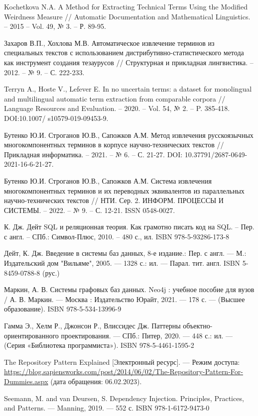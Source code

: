 \begin{thebibliography}{}
	Kochetkova N.A. A Method for Extracting Technical Terms Using the Modified Weirdness Measure // Automatic Documentation and Mathematical Linguistics. – 2015 – Vol. 49, № 3. – Р. 89-95.
	
	Захаров В.П., Хохлова М.В. Автоматическое извлечение терминов из специальных текстов с использованием дистрибутивно-статистического метода как инструмент создания тезаурусов // Структурная и прикладная лингвистика. – 2012. – № 9. – С. 222-233.
	
	Terryn A., Hoste V., Lefever E. In no uncertain terms: a dataset for monolingual and multilingual automatic term extraction from comparable corpora // Language Resources and Evaluation. – 2020. – Vol. 54, № 2. – P. 385-418. DOI:10.1007/ s10579-019-09453-9.
	
	Бутенко Ю.И. Строганов Ю.В., Сапожков А.М. Метод извлечения русскоязычных многокомпонентных терминов в корпусе научно-технических текстов // Прикладная информатика. – 2021. – № 6. – С. 21-27. DOI: 10.37791/2687-0649-2021-16-6-21-27.
	
	Бутенко Ю.И. Строганов Ю.В., Сапожков А.М. Система извлечения многокомпонентных терминов и их переводных эквивалентов из параллельных научно-технических текстов // НТИ. Сер. 2. ИНФОРМ. ПРОЦЕССЫ И СИСТЕМЫ. – 2022. – № 9. – С. 12-21. ISSN 0548-0027.
	
	 К. Дж. Дейт
	SQL и реляционная теория. Как грамотно писать код на SQL. – Пер. с англ. – СПб.: Символ-Плюс, 2010. – 480 с., ил. ISBN 978-5-93286-173-8
	
	Дейт, К. Дж. Введение в системы баз данных, 8-е издание.: Пер. с англ. — М.: Издательский дом "Вильяме", 2005. — 1328 с.: ил. — Парал. тит. англ. ISBN 5-8459-0788-8 (рус.)
	
	Маркин, А. В. Системы графовых баз данных. Neo4j : учебное пособие для вузов / А. В. Маркин. — Москва : Издательство Юрайт, 2021. — 178 с. — (Высшее образование). ISBN 978-5-534-13996-9
	
	Гамма Э., Хелм Р., Джонсон Р., Влиссидес Дж. Паттерны объектно-ориентированного проектирования. — СПб.: Питер, 2020. — 448 с.: ил. — (Серия «Библиотека программиста»). ISBN 978-5-4461-1595-2
	
	The Repository Pattern Explained [Электронный ресурс]. — Режим доступа: \url{https://blog.sapiensworks.com/post/2014/06/02/The-Repository-Pattern-For-Dummies.aspx} (дата обращения: 06.02.2023).
	
	Seemann, M. and van Deursen, S. Dependency Injection. Principles, Practices, and Patterns. — Manning, 2019. — 552 с. ISBN 978-1-6172-9473-0
\end{thebibliography}
\endgroup

\pagebreak